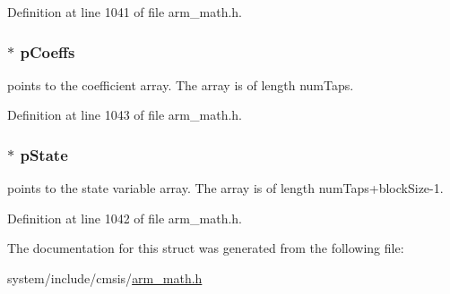 Definition at line 1041 of file arm\+\_\+math.\+h.

\subsubsection[{\texorpdfstring{p\+Coeffs}{pCoeffs}}]{$\ast$ p\+Coeffs}\hypertarget{structarm__fir__instance__q15_a7ca181a37f714d174445f486bebce26f}{}\label{structarm__fir__instance__q15_a7ca181a37f714d174445f486bebce26f}
points to the coefficient array. The array is of length num\+Taps. 

Definition at line 1043 of file arm\+\_\+math.\+h.

\subsubsection[{\texorpdfstring{p\+State}{pState}}]{$\ast$ p\+State}\hypertarget{structarm__fir__instance__q15_ae29dfdb736374fcddaeaec4b7770170c}{}\label{structarm__fir__instance__q15_ae29dfdb736374fcddaeaec4b7770170c}
points to the state variable array. The array is of length num\+Taps+block\+Size-\/1. 

Definition at line 1042 of file arm\+\_\+math.\+h.



The documentation for this struct was generated from the following file\+:\begin{DoxyCompactItemize}
\item 
system/include/cmsis/\hyperlink{arm__math_8h}{arm\+\_\+math.\+h}\end{DoxyCompactItemize}
